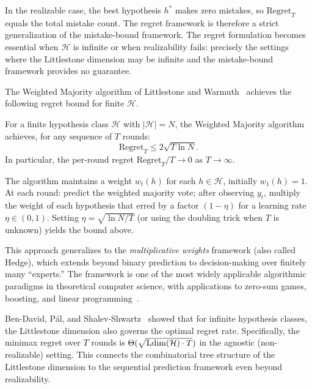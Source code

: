 \begin{remark}
\label{rmk:mistake-vs-regret}
In the realizable case, the best hypothesis $h^*$ makes zero mistakes, so $\mathrm{Regret}_T$ equals the total mistake count. The regret framework is therefore a strict generalization of the mistake-bound framework. The regret formulation becomes essential when $\mathcal{H}$ is infinite or when realizability fails: precisely the settings where the Littlestone dimension may be infinite and the mistake-bound framework provides no guarantee.
\end{remark}

The Weighted Majority algorithm of Littlestone and Warmuth~\cite{Littlestone1988} achieves the following regret bound for finite $\mathcal{H}$.

\begin{thm}
\label{thm:weighted-majority}
For a finite hypothesis class $\mathcal{H}$ with $|\mathcal{H}| = N$, the Weighted Majority algorithm achieves, for any sequence of $T$ rounds:
\[
\mathrm{Regret}_T \leq 2\sqrt{T \ln N}.
\]
In particular, the per-round regret $\mathrm{Regret}_T / T \to 0$ as $T \to \infty$.
\end{thm}

The algorithm maintains a weight $w_t(h)$ for each $h \in \mathcal{H}$, initially $w_1(h) = 1$. At each round: predict the weighted majority vote; after observing $y_t$, multiply the weight of each hypothesis that erred by a factor $(1 - \eta)$ for a learning rate $\eta \in (0, 1)$. Setting $\eta = \sqrt{\ln N / T}$ (or using the doubling trick when $T$ is unknown) yields the bound above.

This approach generalizes to the \emph{multiplicative weights} framework (also called Hedge), which extends beyond binary prediction to decision-making over finitely many ``experts.'' The framework is one of the most widely applicable algorithmic paradigms in theoretical computer science, with applications to zero-sum games, boosting, and linear programming~\cite{ShalevShwartzBenDavid2014}.

\begin{remark}
\label{rmk:regret-ldim}
Ben-David, P\'al, and Shalev-Shwartz~\cite{BenDavidPalShalevShwartz2009} showed that for infinite hypothesis classes, the Littlestone dimension also governs the optimal regret rate. Specifically, the minimax regret over $T$ rounds is $\Theta(\sqrt{\mathrm{Ldim}(\mathcal{H}) \cdot T})$ in the agnostic (non-realizable) setting. This connects the combinatorial tree structure of the Littlestone dimension to the sequential prediction framework even beyond realizability.
\end{remark}

